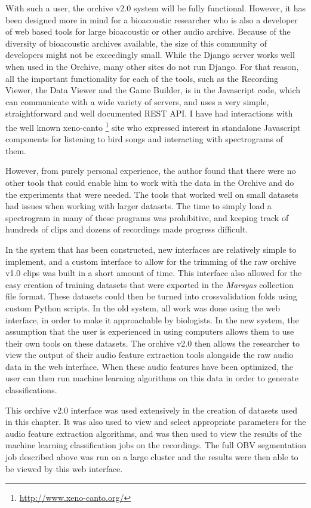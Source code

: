 With such a user, the orchive v2.0 system will be fully functional.
However, it has been designed more in mind for a bioacoustic
researcher who is also a developer of web based tools for large
bioacoustic or other audio archive.  Because of the diversity of
bioacoustic archives available, the size of this community of
developers might not be exceedingly small.  While the Django server
works well when used in the Orchive, many other sites do not run
Django.  For that reason, all the important functionality for each of
the tools, such as the Recording Viewer, the Data Viewer and the Game
Builder, is in the Javascript code, which can communicate with a wide
variety of servers, and uses a very simple, straightforward and well
documented REST API.  I have had interactions with the well known
xeno-canto \footnote{\url{http://www.xeno-canto.org/}} site who
expressed interest in standalone Javascript components for listening
to bird songs and interacting with spectrograms of them.

However, from purely personal experience, the author found that there
were no other tools that could enable him to work with the data in the
Orchive and do the experiments that were needed.  The tools that
worked well on small datasets had issues when working with larger
datasets.  The time to simply load a spectrogram in many of these
programs was prohibitive, and keeping track of hundreds of clips and
dozens of recordings made progress difficult.

In the system that has been constructed, new interfaces are relatively
simple to implement, and a custom interface to allow for the trimming
of the raw orchive v1.0 clips was built in a short amount of time.
This interface also allowed for the easy creation of training datasets
that were exported in the \textit{Marsyas} collection file format.  These
datasets could then be turned into crossvalidation folds using custom
Python scripts.  In the old system, all work was done using the web
interface, in order to make it approachable by biologists.  In the new
system, the assumption that the user is experienced in using computers
allows them to use their own tools on these datasets.  The orchive v2.0
then allows the researcher to view the output of their audio feature
extraction tools alongside the raw audio data in the web interface.
When these audio features have been optimized, the user can then run
machine learning algorithms on this data in order to generate
classifications.

This orchive v2.0 interface was used extensively in the creation of
datasets used in this chapter.  It was also used to view and select
appropriate parameters for the audio feature extraction algorithms,
and was then used to view the results of the machine learning
classification jobs on the recordings.  The full OBV segmentation job
described above was run on a large cluster and the results were then
able to be viewed by this web interface.

